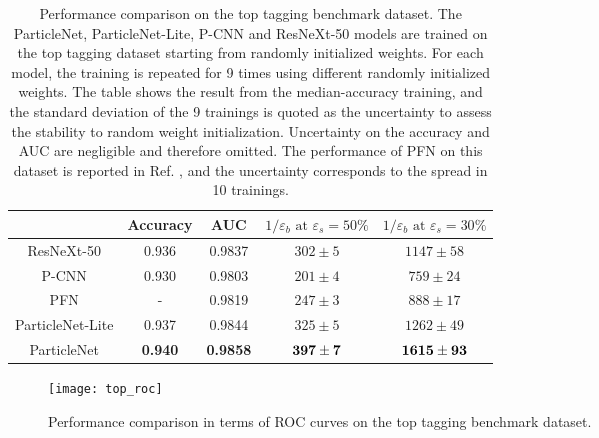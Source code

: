 \documentclass[aps,prd,longbibliography,reprint,amsmath,amssymb,amsfonts]{revtex4-1}
\begin{document}
\begin{table*}[htbp]
\centering
\caption{Performance comparison on the top tagging benchmark dataset. The ParticleNet, ParticleNet-Lite, P-CNN and ResNeXt-50 models are trained on the top tagging dataset starting from randomly initialized weights. For each model, the training is repeated for 9 times using different randomly initialized weights. The table shows the result from the median-accuracy training, and the standard deviation of the 9 trainings is quoted as the uncertainty to assess the stability to random weight initialization. Uncertainty on the accuracy and AUC are negligible and therefore omitted. The performance of PFN on this dataset is reported in Ref. \cite{Komiske:2018cqr}, and the uncertainty corresponds to the spread in 10 trainings.}
\label{tab:results-top}
\begin{ruledtabular}
\begin{tabular}{ccccc}
                       & Accuracy & AUC & $1/\varepsilon_{b}\text{ at }\varepsilon_{s}=50\%$ & $1/\varepsilon_{b}\text{ at }\varepsilon_{s}=30\%$ \\
    \hline
    ResNeXt-50         & 0.936     & 0.9837            & $302\pm5$      & $1147\pm58$       \\
    P-CNN              & 0.930     & 0.9803            & $201\pm4$      & $759\pm24$        \\
    PFN                & -         & 0.9819            & $247\pm3$      & $888\pm17$        \\
    ParticleNet-Lite   & 0.937     & 0.9844            & $325\pm5$      & $1262\pm49$       \\
    ParticleNet        & \bf 0.940 & \bf 0.9858        & $\bf 397\pm7$  & $\bf 1615\pm93$   \\
\end{tabular}
\end{ruledtabular}
\end{table*}


\begin{figure}[htbp]
    \centering
    \texttt{[image: top\_roc]}
    \caption{Performance comparison in terms of ROC curves on the top tagging benchmark dataset.}
    \label{fig:roc-top}
\end{figure}
\end{document}
